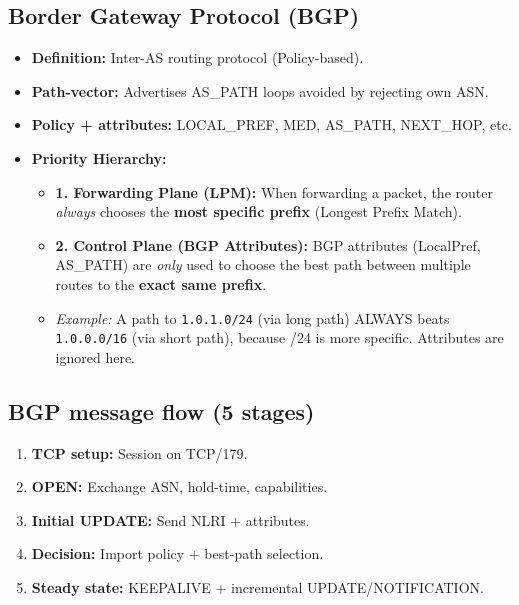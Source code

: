 \subsection{Border Gateway Protocol (BGP)}
\begin{itemize}
    \item \textbf{Definition:} Inter-AS routing protocol (Policy-based).
    \item \textbf{Path-vector:} Advertises AS\_PATH loops avoided by rejecting own ASN.
    \item \textbf{Policy + attributes:} LOCAL\_PREF, MED, AS\_PATH, NEXT\_HOP, etc.
    \item \textbf{Priority Hierarchy:}
    \begin{itemize}
        \item \textbf{1. Forwarding Plane (LPM):} When forwarding a packet, the router \textit{always} chooses the \textbf{most specific prefix} (Longest Prefix Match).
        \item \textbf{2. Control Plane (BGP Attributes):} BGP attributes (LocalPref, AS\_PATH) are \textit{only} used to choose the best path between multiple routes to the \textbf{exact same prefix}.
        \item \textit{Example:} A path to \texttt{1.0.1.0/24} (via long path) ALWAYS beats \texttt{1.0.0.0/16} (via short path), because /24 is more specific. Attributes are ignored here.
    \end{itemize}
\end{itemize}

\subsection{BGP message flow (5 stages)}
\begin{enumerate}
    \item \textbf{TCP setup:} Session on TCP/179.
    \item \textbf{OPEN:} Exchange ASN, hold-time, capabilities.
    \item \textbf{Initial UPDATE:} Send NLRI + attributes.
    \item \textbf{Decision:} Import policy + best-path selection.
    \item \textbf{Steady state:} KEEPALIVE + incremental UPDATE/NOTIFICATION.
\end{enumerate}


